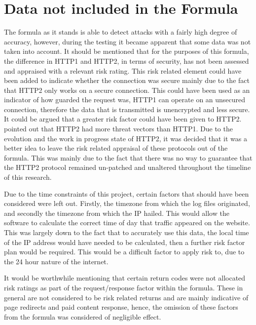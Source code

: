 \section{Data not included in the Formula}

The formula as it stands is able to detect attacks with a fairly high degree of accuracy, however, during the testing it became apparent that some data was not taken into account. It should be mentioned that for the purposes of this formula, the difference in HTTP1 and HTTP2, in terms of security, has not been assessed and appraised with a relevant risk rating. This risk related element could have been added to indicate whether the connection was secure mainly due to the fact that HTTP2 only works on a secure connection. This could have been used as an indicator of how guarded the request was, HTTP1 can operate on an unsecured connection, therefore the data that is transmitted is unencrypted and less secure. It could be argued that a greater risk factor could have been given to HTTP2. \cite{tripathi2018slow} pointed out that HTTP2 had more threat vectors than HTTP1. Due to the evolution and the work in progress state of HTTP2, it was decided that it was a better idea to leave the risk related appraisal of these protocols out of the formula. This was mainly due to the fact that there was no way to guarantee that the HTTP2 protocol remained un-patched and unaltered throughout the timeline of this research.

Due to the time constraints of this project, certain factors that should have been considered were left out. Firstly, the timezone from which the log files originated, and secondly the timezone from which the IP hailed. This would allow the software to calculate the correct time of day that traffic appeared on the website. This was largely down to the fact that to accurately use this data, the local time of the IP address would have needed to be calculated, then a further risk factor plan would be required. This would be a difficult factor to apply risk to, due to the 24 hour nature of the internet.

It would be worthwhile mentioning that certain return codes were not allocated risk ratings as part of the request/response factor within the formula. These in general are not considered to be risk related returns and are mainly indicative of page redirects and paid content response, hence, the omission of these factors from the formula was considered of negligible effect.
